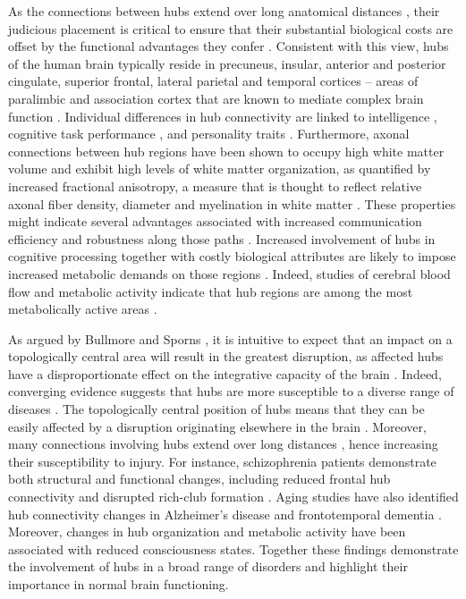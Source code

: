 As the connections between hubs extend over long anatomical distances \citep{Fulcher2016,Towlson2013,VandenHeuvel2011}, their judicious placement is critical to ensure that their substantial biological costs are offset by the functional advantages they confer \citep{DeReus2014,Towlson2013}. Consistent with this view, hubs of the human brain typically reside in precuneus, insular, anterior and posterior cingulate, superior frontal, lateral parietal and temporal cortices \citep{Gong2009,VandenHeuvel2012,VandenHeuvel2013a} -- areas of paralimbic and association cortex that are known to mediate complex brain function \citep{Buckner2009,Mesulam1998}. Individual differences in hub connectivity are linked to intelligence \citep{Li2009,VandenHeuvel2009}, cognitive task performance \citep{Cole2012}, and personality traits \citep{Adelstein2011}. Furthermore, axonal connections between hub regions have been shown to occupy high white matter volume and exhibit high levels of white matter organization, as quantified by increased fractional anisotropy, a measure that is thought to reflect relative axonal fiber density, diameter and myelination in white matter \citep{Collin2014}. These properties might indicate several advantages associated with increased communication efficiency and robustness along those paths \citep{Collin2014}. Increased involvement of hubs in cognitive processing \citep{Buckner2009,Cole2012,Mesulam1998} together with costly biological attributes are likely to impose increased metabolic demands on those regions \citep{Collin2014}. Indeed, studies of cerebral blood flow and metabolic activity indicate that hub regions are among the most metabolically active areas \citep{Vaishnavi2010,Varkuti2011}.

As argued by Bullmore and Sporns \citep{Bullmore2012}, it is intuitive to expect that an impact on a topologically central area will result in the greatest disruption, as affected hubs have a disproportionate effect on the integrative capacity of the brain \citep{DeReus2014}. Indeed, converging evidence suggests that hubs are more susceptible to a diverse range of diseases \citep{Bassett2009a,Crossley2014,Fornito2015}. The topologically central position of hubs means that they can be easily affected by a disruption originating elsewhere in the brain \citep{Zhou2012}. Moreover, many connections involving hubs extend over long distances \citep{VandenHeuvel2012}, hence increasing their susceptibility to injury. For instance, schizophrenia patients demonstrate both structural and functional changes, including reduced frontal hub connectivity \citep{Fornito2012a,VandenHeuvel2010,Zalesky2011} and disrupted rich-club formation \citep{VandenHeuvel2013c}. Aging studies have also identified hub connectivity changes in Alzheimer’s disease \citep{DeHaan2012,Stam2009} and frontotemporal dementia \citep{Agosta2013}. Moreover, changes in hub organization \citep{Achard2012} and metabolic activity \citep{Laureys2004} have been associated with reduced consciousness states. Together these findings demonstrate the involvement of hubs in a broad range of disorders and highlight their importance in normal brain functioning.

